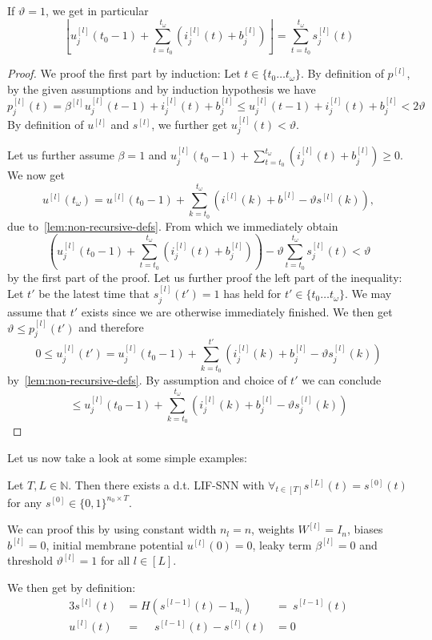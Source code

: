 \begin{remark}
  If \(ϑ=1\), we get in particular
  \[ \left\lfloor u^{[l]}_j(t_0-1)+\sum_{t=t_0}^{t_{ω}}(i^{[l]}_j(t)+b^{[l]}_j) \right\rfloor = \sum_{t=t_0}^{t_{ω}}s^{[l]}_j(t) \]
\end{remark}

\begin{proof}
  We proof the first part by induction: Let \(t∈\{t_0…t_{ω}\}\). By definition of \(p^{[l]}\), by the given assumptions and by induction hypothesis we have
  \[ p^{[l]}_j(t)=β^{[l]}u^{[l]}_j(t-1)+i^{[l]}_j(t)+b^{[l]}_j ≤ u^{[l]}_j(t-1)+i^{[l]}_j(t)+b^{[l]}_j<2ϑ  \]
  By definition of \(u^{[l]}\) and \(s^{[l]}\), we further get \(u^{[l]}_j(t)<ϑ\).

  Let us further assume \(β=1\) and \(u^{[l]}_j(t_0-1)+\sum_{t=t_0}^{t_{ω}}(i^{[l]}_j(t)+b^{[l]}_j)≥0\).
  We now get
  \[ u^{[l]}(t_{ω}) = u^{[l]}(t_0-1)+\sum_{k=t_0}^{t_{ω}}\left(i^{[l]}(k)+b^{[l]}-ϑs^{[l]}(k)\right),  \]
  due to~\autoref{lem:non-recursive-defs}. From which we immediately obtain
  \[ \left( u^{[l]}_j(t_0-1)+\sum_{t=t_0}^{t_{ω}}(i^{[l]}_j(t)+b^{[l]}_j) \right) - ϑ\sum_{t=t_0}^{t_{ω}}s^{[l]}_j(t) <ϑ \]
  by the first part of the proof. Let us further proof the left part of the inequality: Let \(t'\) be the latest time that \(s^{[l]}_j(t')=1\) has held for \(t'∈\{t_0…t_{ω}\}\). We may assume that \(t'\) exists since we are otherwise immediately finished. We then get \(ϑ≤p^{[l]}_j(t')\) and therefore
  \[ 0≤u^{[l]}_j(t')=u^{[l]}_j(t_0-1)+\sum_{k=t_0}^{t'}\left(i^{[l]}_j(k)+b^{[l]}_j-ϑs^{[l]}_j(k)\right) \]
  by~\autoref{lem:non-recursive-defs}. By assumption and choice of \(t'\) we can conclude
  \[ ≤u^{[l]}_j(t_0-1)+\sum_{k=t_0}^{t_{ω}}\left(i^{[l]}_j(k)+b^{[l]}_j-ϑs^{[l]}_j(k)\right) \]
\end{proof}

Let us now take a look at some simple examples:

\begin{example}
  Let \(T,L∈ℕ\). Then there exists a d.t. LIF-SNN with \(∀_{t∈[T]}s^{[L]}(t)=s^{[0]}(t)\) for any \(s^{[0]}∈\{0,1\}^{n_0×T}\).

  We can proof this by using constant width \(n_l=n\), weights \(W^{[l]}=I_n\), biases \(b^{[l]}=0\), initial membrane potential \(u^{[l]}(0)=0\), leaky term \(β^{[l]}=0\) and threshold \(ϑ^{[l]}=1\) for all \(l∈[L]\).

  We then get by definition:
  \begin{alignat*}{3}
    s^{[l]}(t) & = H(s^{[l-1]}(t)-1_{n_l})  &= \ s^{[l-1]}(t) \\
    u^{[l]}(t) & = \phantom{H(}s^{[l-1]}(t)-s^{[l]}(t)&= 0
  \end{alignat*}
\end{example}

